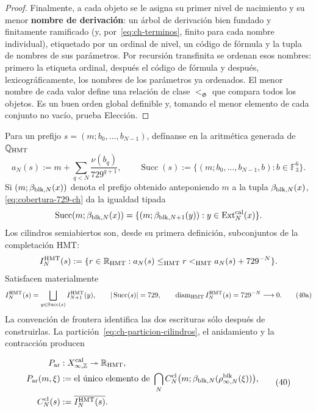 \begin{proof}
Finalmente, a cada objeto se le asigna su primer nivel de nacimiento y su
menor \textbf{nombre de derivación}: un árbol de derivación bien fundado y
finitamente ramificado (y, por~\eqref{eq:ch-terminos}, finito para cada nombre individual), etiquetado por un
ordinal de nivel, un código de fórmula y la tupla de nombres de sus parámetros.
Por recursión transfinita se ordenan esos nombres: primero la etiqueta ordinal,
después el código de fórmula y después, lexicográficamente, los nombres de los
parámetros ya ordenados. El menor nombre de cada valor define una relación de
clase \(<_{\mathfrak G}\) que compara todos los objetos. Es un buen orden
global definible y, tomando el menor elemento de cada conjunto no vacío,
prueba Elección.
\end{proof}



Para un prefijo \(s=(m;b_0,\ldots,b_{N-1})\), defínanse en la aritmética
generada de \(\mathbb Q_{\rm HMT}\)
\[
 a_N(s):=m+\sum_{q<N}\frac{\nu(b_q)}{729^{q+1}},
 \qquad
 \operatorname{Succ}(s):=
 \{(m;b_0,\ldots,b_{N-1},b):b\in\mathbb F_3^6\}.
\]
Si \((m;\beta_{{\rm blk},N}(x))\) denota el prefijo obtenido anteponiendo
\(m\) a la tupla \(\beta_{{\rm blk},N}(x)\),
\eqref{eq:cobertura-729-ch} da la igualdad tipada
\[
 \operatorname{Succ}(m;\beta_{{\rm blk},N}(x))
 =\{(m;\beta_{{\rm blk},N+1}(y)):
       y\in\operatorname{Ext}^{\rm cal}_N(x)\}.
\]
Los cilindros semiabiertos son, desde su primera definición, subconjuntos de
la completación HMT:
\[
 I_N^{\rm HMT}(s):=
 \{r\in\mathbb R_{\rm HMT}:
      a_N(s)\le_{\rm HMT}r<_{\rm HMT}a_N(s)+729^{-N}\}.
\]
Satisfacen materialmente
\[
 I_N^{\rm HMT}(s)=
 \bigsqcup_{y\in\operatorname{Succ}(s)}I_{N+1}^{\rm HMT}(y),
 \qquad |\operatorname{Succ}(s)|=729,
 \qquad \operatorname{diam}_{\rm HMT}I_N^{\rm HMT}(s)
      =729^{-N}\longrightarrow0.
\tag{40a}\label{eq:ch-particion-cilindros}
\]
La convención de frontera identifica las dos escrituras sólo después de
construirlas. La partición~\eqref{eq:ch-particion-cilindros}, el anidamiento y la contracción producen

\[
\begin{aligned}
 P_{\rm ar}&:X_{\infty,\mathbb Z}^{\rm cal}
     \twoheadrightarrow\mathbb R_{\rm HMT},\\
 P_{\rm ar}(m,\xi)
   &:=\text{el único elemento de }
     \bigcap_N C_N^{\rm cl}
       \bigl(m;\beta_{{\rm blk},N}(\rho^{\rm blk}_{\infty,N}(\xi))\bigr),\\
 C_N^{\rm cl}(s)&:=\overline{I_N^{\rm HMT}(s)}.
\end{aligned}
\tag{40}\label{eq:ch-proyeccion-arquimediana}
\]

